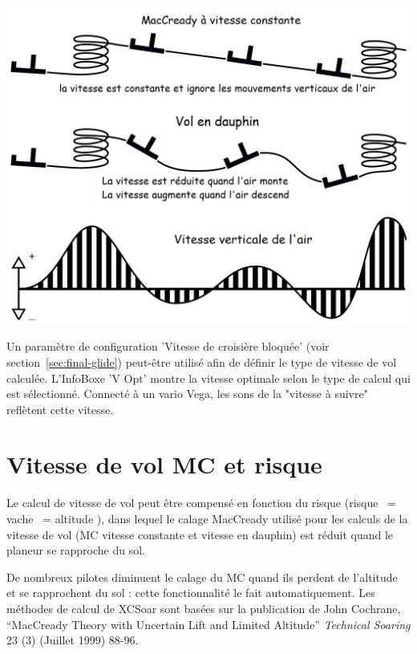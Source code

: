 \begin{center}
\includegraphics[angle=0,width=1.0\linewidth,keepaspectratio='true']{figures/figure_speed_to_fly.png}
\end{center}

Un paramètre de configuration 'Vitesse de croisière bloquée' (voir section~\ref{sec:final-glide}) peut-être utilisé afin de définir le type de vitesse de vol calculée. L'InfoBoxe 'V Opt' montre la vitesse optimale selon le type de calcul qui est sélectionné. Connecté à un vario Vega, les sons de la "vitesse à suivre"  reflètent cette vitesse.

\section{Vitesse de vol MC et risque}\label{sec:speed-fly-with}
Le calcul de vitesse de vol peut être compensé en fonction du risque (risque ~= vache  ~= altitude ), dans lequel le calage MacCready utilisé pour les calculs de la vitesse de vol (MC vitesse constante et vitesse en dauphin) est réduit quand le planeur se rapproche du sol.

De nombreux pilotes diminuent le calage du MC quand ils perdent de l'altitude et se rapprochent du sol : cette fonctionnalité le fait automatiquement. Les méthodes de calcul de XCSoar sont basées sur la publication de John  Cochrane, ``MacCready Theory with Uncertain Lift and Limited  Altitude'' {\em Technical Soaring} 23 (3) (Juillet 1999) 88-96.

